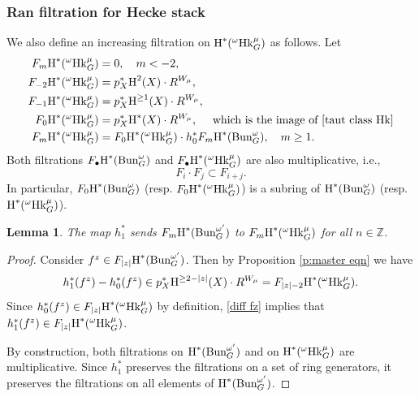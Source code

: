 \documentclass[reqno]{amsart}
\numberwithin{equation}{subsection}
\newtheorem{lemma}[subsubsection]{Lemma}
\theoremstyle{definition}
\def\ZZ{\mathbb{Z}}
\newcommand{\Bun}{\textup{Bun}}
\newcommand\Hk{\mathrm{Hk}}
\newcommand{\bu}{\bullet}
\newcommand{\cohog}[2]{\textup{H}^{#1}({#2})}     %
\newcommand{\om}{\omega}
\begin{document}
\subsubsection{Ran filtration for Hecke stack}\label{sssec:split-filtration}
We also define an increasing filtration on $\cohog{*}{{}^{\om} \Hk^{\mu}_G}$ as follows. Let
\begin{align*}
F_{m}\cohog{*}{{}^{\om} \Hk^{\mu}_G} & =0, \quad m<-2,\\
F_{-2}\cohog{*}{{}^{\om} \Hk^{\mu}_G}& =p_{X}^{*}\cohog{2}{X}\cdot R^{W_{\mu}},\\
F_{-1}\cohog{*}{{}^{\om} \Hk^{\mu}_G}& =p_{X}^{*}\cohog{\ge1}{X}\cdot R^{W_{\mu}},\\
F_{0}\cohog{*}{{}^{\om} \Hk^{\mu}_G}&=p_{X}^{*}\cohog{*}{X}\cdot R^{W_{\mu}}, \quad \mbox{ which is the image of \eqref{taut class Hk}}\\
F_{m}\cohog{*}{{}^{\om} \Hk^{\mu}_G}&=F_{0}\cohog{*}{{}^{\om} \Hk^{\mu}_G}\cdot h_{0}^{*}F_{m}\cohog{*}{\Bun^{\om}_{G}}, \quad m \geq 1.
\end{align*}
Both filtrations $F_\bu\cohog{*}{\Bun_G^\om}$ and $F_\bu\cohog{*}{{}^\om\Hk^\mu_G}$ are also multiplicative, i.e.,
\begin{equation*}
F_{i}\cdot F_{j}\subset F_{i+j}.
\end{equation*}
In particular, $F_{0}\cohog{*}{\Bun^{\om}_{G}}$ (resp. $F_{0}\cohog{*}{{}^{\om} \Hk^{\mu}_G}$) is a subring of $\cohog{*}{\Bun^{\om}_{G}}$ (resp. $\cohog{*}{{}^{\om} \Hk^{\mu}_G}$).




\begin{lemma}\label{l:h0}
The map $h_{1}^{*}$ sends  $F_{m}\cohog{*}{\Bun^{\om'}_{G}}$ to $F_{m}\cohog{*}{{}^{\om} \Hk^{\mu}_G}$ for all $n\in\ZZ$.
\end{lemma}
\begin{proof}
Consider $f^{z}\in F_{|z|}\cohog{*}{\Bun^{\om'}_{G}}$. Then by Proposition \ref{p:master eqn} we have
\begin{equation}\label{diff fz}
h_{1}^{*}(f^{z})-h_{0}^{*}(f^{z})\in p_{X}^{*}\cohog{\ge 2-|z|}{X}\cdot R^{W_{\mu}}=F_{|z|-2}\cohog{*}{{}^{\om} \Hk^{\mu}_G}.
\end{equation}
Since $h_{0}^{*}(f^{z}) \in F_{|z|}\cohog{*}{{}^{\om} \Hk^{\mu}_G}$ by definition, \eqref{diff fz} implies that $h_{1}^{*}(f^{z})\in F_{|z|}\cohog{*}{{}^{\om} \Hk^{\mu}_G}$.

By construction, both filtrations on $\cohog{*}{\Bun^{\om'}_{G}}$ and on $\cohog{*}{{}^{\om} \Hk^{\mu}_G}$ are multiplicative. Since $h_{1}^{*}$ preserves the filtrations on a set of ring generators, it preserves the filtrations on all elements of $\cohog{*}{\Bun^{\om'}_{G}}$.
\end{proof}
\end{document}
